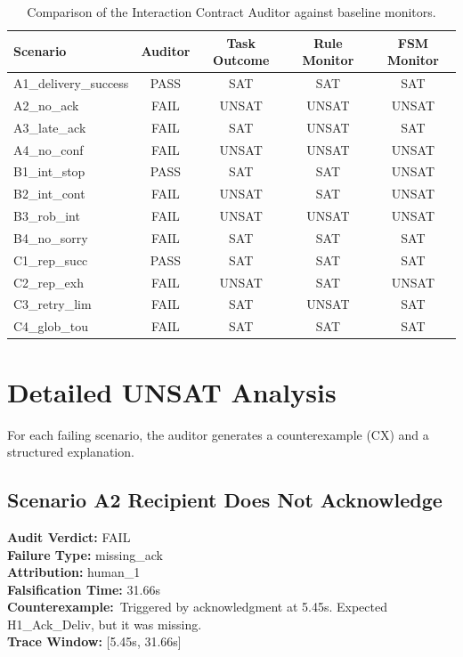 \documentclass[10pt, letterpaper]{article}
\begin{document}
\begin{table}[H]
\centering
\begin{tabularx}{\textwidth}{l c c c c}
\toprule
\textbf{Scenario} & \textbf{Auditor} & \textbf{Task Outcome} & \textbf{Rule Monitor} & \textbf{FSM Monitor} \\
\midrule
A1\_delivery\_success & PASS & SAT & SAT & SAT \\
A2\_no\_ack & FAIL & UNSAT & UNSAT & UNSAT \\
A3\_late\_ack & FAIL & SAT & UNSAT & SAT \\
A4\_no\_conf & FAIL & UNSAT & UNSAT & UNSAT \\
B1\_int\_stop & PASS & SAT & SAT & UNSAT \\
B2\_int\_cont & FAIL & UNSAT & SAT & UNSAT \\
B3\_rob\_int & FAIL & UNSAT & UNSAT & UNSAT \\
B4\_no\_sorry & FAIL & SAT & SAT & SAT \\
C1\_rep\_succ & PASS & SAT & SAT & SAT \\
C2\_rep\_exh & FAIL & UNSAT & SAT & UNSAT \\
C3\_retry\_lim & FAIL & SAT & UNSAT & SAT \\
C4\_glob\_tou & FAIL & SAT & SAT & SAT \\
\bottomrule
\end{tabularx}
\caption{Comparison of the Interaction Contract Auditor against baseline monitors.}
\end{table}

\section{Detailed UNSAT Analysis}
For each failing scenario, the auditor generates a counterexample (CX) and a structured explanation.

\subsection{Scenario A2 Recipient Does Not Acknowledge}
\textbf{Audit Verdict:} FAIL \\
\textbf{Failure Type:} missing\_ack \\
\textbf{Attribution:} human\_1 \\
\textbf{Falsification Time:} 31.66s \\
\textbf{Counterexample:}\ Triggered by acknowledgment at 5.45s. Expected H1\_Ack\_Deliv, but it was missing. \\
\textbf{Trace Window:} [5.45s, 31.66s]
\end{document}
